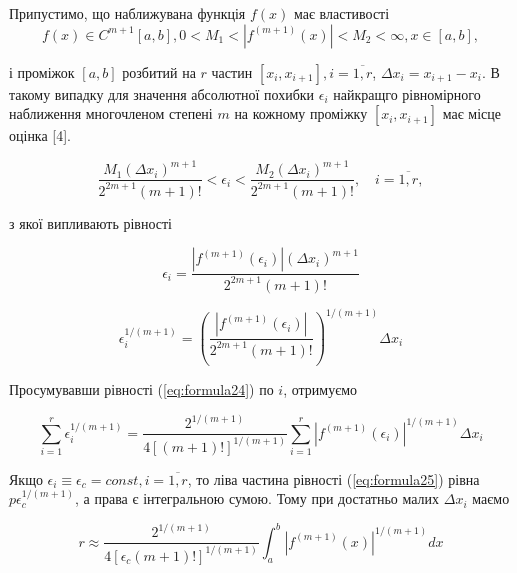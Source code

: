 \documentclass[ukrainian,14pt]{extarticle}
\begin{document}

Припустимо, що наближувана функція $f(x)$ має властивості 
\begin{equation}\label{eq:formula21}
f(x) \in C^{m+1}[a,b], 0 < M_1 < |f^{(m+1)}(x)| < M_2 < \infty, x \in [a, b],
\end{equation}

і проміжок $[a, b]$ розбитий на $r$ частин $[x_i, x_{i+1}], i=\overline{1, r}$,
$\Delta x_i = x_{i+1} - x_i$. В такому випадку для значення абсолютної похибки $\epsilon_i$ найкращго рівномірного наближення многочленом степені $m$ на кожному проміжку $[x_i, x_{i+1}]$ має місце оцінка [4].


\begin{equation}\label{eq:formula22}
    \frac {M_1(\Delta x_i)^{m+1}} {2^{2m+1} (m+1)!} < \epsilon_i < \frac {M_2(\Delta x_i)^{m+1}} {2^{2m+1} (m+1)!}, \quad i = \overline{1, r} ,
\end{equation}

з якої випливають рівності

\begin{equation}\label{eq:formula23}
    \epsilon_i = \frac {|f^{(m+1)}(\epsilon_i)|(\Delta x_i)^{m+1}} {2^{2m+1} (m+1)!}
\end{equation}

\begin{equation}\label{eq:formula24}
    \epsilon_i^{1/(m+1)} = \left(\frac {|f^{(m+1)}(\epsilon_i)|} {2^{2m+1} (m+1)!} \right)^{1/(m+1)} \Delta x_i
\end{equation}


Просумувавши рівності (\ref{eq:formula24}) по $i$, отримуємо

\begin{equation}\label{eq:formula25}
  \sum_{i=1}^r \epsilon_i ^{1/(m+1)} = \frac{2^{1/(m+1)}}{4 [(m+1)!]^{1/(m+1)}} \sum_{i=1}^r |f^{(m+1)}(\epsilon_i)|^{1/(m+1)} \Delta x_i  
\end{equation}

Якщо $\epsilon_i \equiv \epsilon_c = const, i = \overline{1, r}$, то ліва частина рівності (\ref{eq:formula25}) рівна $p \epsilon_c ^{1/(m+1)}$, а права є інтегральною сумою. Тому при достатньо малих $\Delta x_i$ маємо

\begin{equation}\label{eq:formula26}
    r \approx \frac{2^{1/(m+1)}}{4[\epsilon_c (m+1)!]^{1/(m+1)}} \int_a^b |f^{(m+1)}(x)|^{1/(m+1)}dx
\end{equation}
\end{document}
